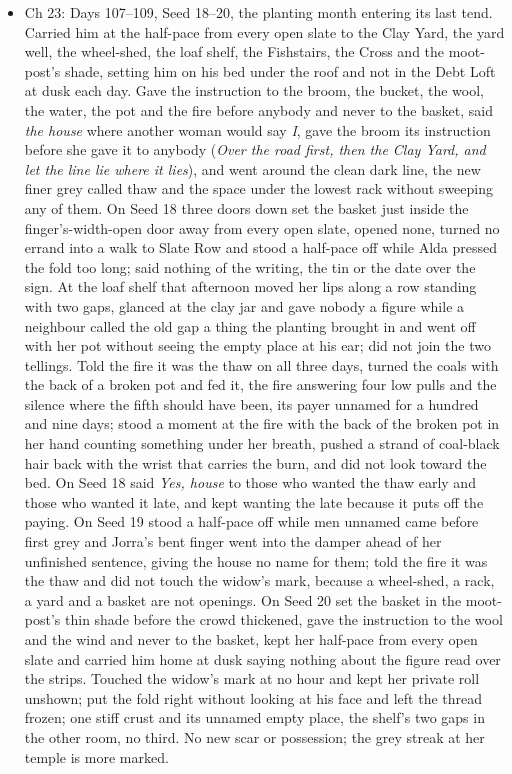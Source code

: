 \documentclass{design/chronicle}
\begin{document}
{\begin{itemize}[leftmargin=1.4em,itemsep=1pt,topsep=3pt,parsep=0pt]
\item Ch 23: Days 107–109, Seed 18–20, the planting month entering its last tend. Carried him at the half-pace from every open slate to the Clay Yard, the yard well, the wheel-shed, the loaf shelf, the Fishstairs, the Cross and the moot-post’s shade, setting him on his bed under the roof and not in the Debt Loft at dusk each day. Gave the instruction to the broom, the bucket, the wool, the water, the pot and the fire before anybody and never to the basket, said \emph{the house} where another woman would say \emph{I}, gave the broom its instruction before she gave it to anybody (\emph{Over the road first, then the Clay Yard, and let the line lie where it lies}), and went around the clean dark line, the new finer grey called thaw and the space under the lowest rack without sweeping any of them. On Seed 18 three doors down set the basket just inside the finger’s-width-open door away from every open slate, opened none, turned no errand into a walk to Slate Row and stood a half-pace off while Alda pressed the fold too long; said nothing of the writing, the tin or the date over the sign. At the loaf shelf that afternoon moved her lips along a row standing with two gaps, glanced at the clay jar and gave nobody a figure while a neighbour called the old gap a thing the planting brought in and went off with her pot without seeing the empty place at his ear; did not join the two tellings. Told the fire it was the thaw on all three days, turned the coals with the back of a broken pot and fed it, the fire answering four low pulls and the silence where the fifth should have been, its payer unnamed for a hundred and nine days; stood a moment at the fire with the back of the broken pot in her hand counting something under her breath, pushed a strand of coal-black hair back with the wrist that carries the burn, and did not look toward the bed. On Seed 18 said \emph{Yes, house} to those who wanted the thaw early and those who wanted it late, and kept wanting the late because it puts off the paying. On Seed 19 stood a half-pace off while men unnamed came before first grey and Jorra’s bent finger went into the damper ahead of her unfinished sentence, giving the house no name for them; told the fire it was the thaw and did not touch the widow’s mark, because a wheel-shed, a rack, a yard and a basket are not openings. On Seed 20 set the basket in the moot-post’s thin shade before the crowd thickened, gave the instruction to the wool and the wind and never to the basket, kept her half-pace from every open slate and carried him home at dusk saying nothing about the figure read over the strips. Touched the widow’s mark at no hour and kept her private roll unshown; put the fold right without looking at his face and left the thread frozen; one stiff crust and its unnamed empty place, the shelf’s two gaps in the other room, no third. No new scar or possession; the grey streak at her temple is more marked.


\end{itemize}}
\end{document}
